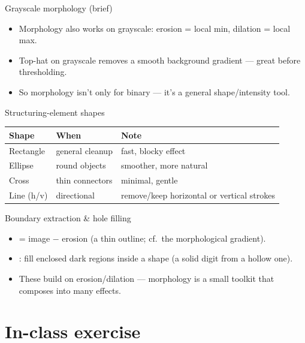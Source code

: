 \documentclass[10pt,aspectratio=169]{beamer}
\begin{document}
\begin{frame}{Grayscale morphology (brief)}
  \begin{itemize}
    \item Morphology also works on grayscale: erosion = local min, dilation = local max.
    \item Top-hat on grayscale removes a smooth background gradient — great before thresholding.
    \item So morphology isn't only for binary — it's a general shape/intensity tool.
  \end{itemize}
\end{frame}

\begin{frame}{Structuring-element shapes}
  \begin{center}
  \begin{tabular}{@{}lll@{}}
    \toprule
    \textbf{Shape} & \textbf{When} & \textbf{Note} \\
    \midrule
    Rectangle & general cleanup & fast, blocky effect \\
    Ellipse & round objects & smoother, more natural \\
    Cross & thin connectors & minimal, gentle \\
    Line (h/v) & directional & remove/keep horizontal or vertical strokes \\
    \bottomrule
  \end{tabular}
  \end{center}
\end{frame}

\begin{frame}{Boundary extraction \& hole filling}
  \begin{itemize}
    \item {} = image $-$ erosion (a thin outline; cf.\ the morphological gradient).
    \item {}: fill enclosed dark regions inside a shape (a solid digit from a hollow one).
    \item These build on erosion/dilation — morphology is a small toolkit that composes into many effects.
  \end{itemize}
\end{frame}

\section{In-class exercise}
\end{document}
